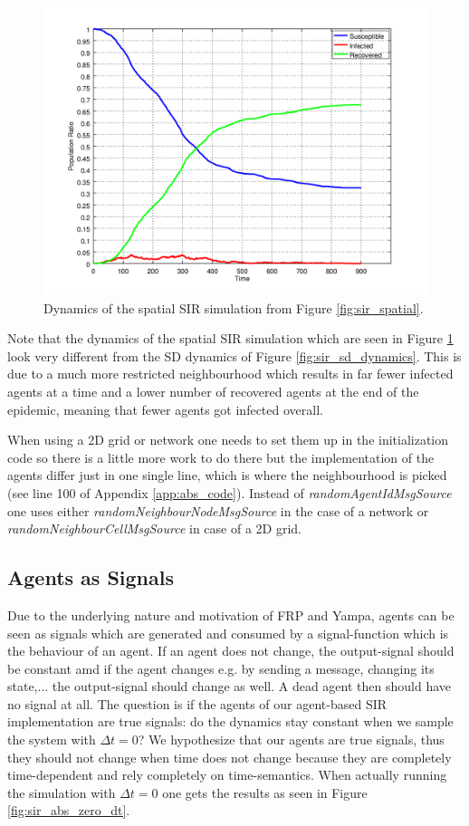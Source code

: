 \begin{figure}
	\centering
	\includegraphics[width=.6\textwidth, angle=0]{./../shared/fig/spatial/SIR_spatial_dynamics_52x52_900time_1dt_parallel.png}
	\caption{Dynamics of the spatial SIR simulation from Figure \ref{fig:sir_spatial}.}
	\label{fig:sir_spatial_dynamics}
\end{figure}

Note that the dynamics of the spatial SIR simulation which are seen in Figure \ref{fig:sir_spatial_dynamics} look very different from the SD dynamics of Figure \ref{fig:sir_sd_dynamics}. This is due to a much more restricted neighbourhood which results in far fewer infected agents at a time and a lower number of recovered agents at the end of the epidemic, meaning that fewer agents got infected overall.

When using a 2D grid or network one needs to set them up in the initialization code so there is a little more work to do there but the implementation of the agents differ just in one single line, which is where the neighbourhood is picked (see line 100 of Appendix \ref{app:abs_code}). Instead of \textit{randomAgentIdMsgSource} one uses either \textit{randomNeighbourNodeMsgSource} in the case of a network or \textit{randomNeighbourCellMsgSource} in case of a 2D grid.

\subsection{Agents as Signals}
Due to the underlying nature and motivation of FRP and Yampa, agents can be seen as signals which are generated and consumed by a signal-function which is the behaviour of an agent.  If an agent does not change, the output-signal should be constant amd if the agent changes e.g. by sending a message, changing its state,... the output-signal should change as well. A dead agent then should have no signal at all.
The question is if the agents of our agent-based SIR implementation are true signals: do the dynamics stay constant when we sample the system with $\Delta t = 0$? We hypothesize that our agents are true signals, thus they should not change when time does not change because they are completely time-dependent and rely completely on time-semantics. When actually running the simulation with $\Delta t = 0$ one gets the results as seen in Figure \ref{fig:sir_abs_zero_dt}.

